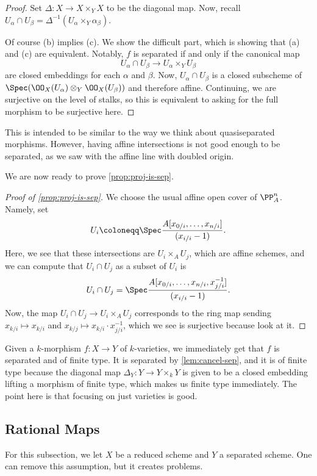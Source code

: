 \documentclass[../notes.tex]{subfiles}
\begin{document}
\begin{proof}
	Set $\Delta\colon X\to X\times_YX$ to be the diagonal map. Now, recall $U_\alpha\cap U_\beta=\Delta^{-1}(U_\alpha\times_Y\alpha_\beta)$.

	Of course (b) implies (c). We show the difficult part, which is showing that (a) and (c) are equivalent. Notably, $f$ is separated if and only if the canonical map
	\[U_\alpha\cap U_\beta\to U_\alpha\times_YU_\beta\]
	are closed embeddings for each $\alpha$ and $\beta$. Now, $U_\alpha\cap U_\beta$ is a closed subscheme of $\Spec(\OO_X(U_\alpha)\otimes_Y\OO_X(U_\beta))$ and therefore affine. Continuing, we are surjective on the level of stalks, so this is equivalent to asking for the full morphism to be surjective here.
\end{proof}
\begin{remark}
	This is intended to be similar to the way we think about quasiseparated morphisms. However, having affine intersections is not good enough to be separated, as we saw with the affine line with doubled origin.
\end{remark}
We are now ready to prove \autoref{prop:proj-is-sep}.
\begin{proof}[Proof of \autoref{prop:proj-is-sep}]
	We choose the usual affine open cover of $\PP^n_A$. Namely, set
	\[U_i\coloneqq\Spec\frac{A[x_{0/i},\ldots,x_{n/i}]}{(x_{i/i}-1)}.\]
	Here, we see that these intersections are $U_i\times_AU_j$, which are affine schemes, and we can compute that $U_i\cap U_j$ as a subset of $U_i$ is
	\[U_i\cap U_j=\Spec\frac{A[x_{0/i},\ldots,x_{n/i},x_{j/i}^{-1}]}{(x_{i/i}-1)}.\]
	Now, the map $U_i\cap U_j\to U_i\times_AU_j$ corresponds to the ring map sending $x_{k/i}\mapsto x_{k/i}$ and $x_{k/j}\mapsto x_{k/i}\cdot x_{j/i}^{-1}$, which we see is surjective because look at it.
\end{proof}
\begin{remark}
	Given a $k$-morphism $f\colon X\to Y$ of $k$-varieties, we immediately get that $f$ is separated and of finite type. It is separated by \autoref{lem:cancel-sep}, and it is of finite type because the diagonal map $\Delta_Y\colon Y\to Y\times_kY$ is given to be a closed embedding lifting a morphism of finite type, which makes us finite type immediately. The point here is that focusing on just varieties is good.
\end{remark}

\subsection{Rational Maps}
For this subsection, we let $X$ be a reduced scheme and $Y$ a separated scheme. One can remove this assumption, but it creates problems.
\end{document}
